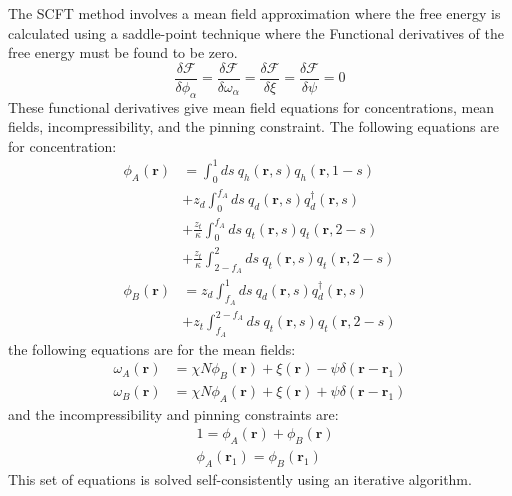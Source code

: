 \documentclass[twocolumn,aps,floatfix,nobibnotes]{revtex4-1}
\begin{document}
The SCFT method involves a mean field approximation where the free energy is calculated using a saddle-point technique where the Functional derivatives of the free energy must be found to be zero.
\begin{equation}
\frac{\delta \mathscr{F} }{\delta \phi_{\alpha}} = \frac{\delta \mathscr{F} }{\delta \omega_{\alpha}} = 
\frac{\delta \mathscr{F} }{\delta \xi} = 
\frac{\delta \mathscr{F} }{\delta \psi} = 0
\end{equation}
These functional derivatives give mean field equations for concentrations, mean fields, incompressibility, and the pinning constraint. The following equations are for concentration:
\begin{align}
\phi_A (\textbf{r}) &= \int_0^1 ds \ q_h (\textbf{r},s) q_h (\textbf{r},1-s) \nonumber \\
&+ z_d \int_0^{f_A} ds \ q_d (\textbf{r},s) q_d^{\dagger} (\textbf{r},s) \nonumber \\
&+ \frac{z_t}{\kappa} \int_0^{f_A} ds \ q_t (\textbf{r},s) q_t (\textbf{r},2-s) \nonumber \\
&+ \frac{z_t}{\kappa} \int_{2-f_A}^{2} ds \ q_t (\textbf{r},s) q_t (\textbf{r},2-s) \\
\phi_B (\textbf{r}) &= z_d \int_{f_A}^1  ds\ q_d (\textbf{r},s) q_d^{\dagger} (\textbf{r},s) \nonumber \\
&+ z_t \int_{f_A}^{2-f_A} ds \ q_t (\textbf{r},s) q_t (\textbf{r},2-s)
\end{align}
the following equations are for the mean fields:
\begin{align}
\omega_A (\textbf{r}) &= \chi N \phi_B(\textbf{r}) + \xi(\textbf{r}) - \psi \delta (\textbf{r}-\textbf{r}_1) \\
\omega_B (\textbf{r}) &= \chi N \phi_A(\textbf{r}) + \xi(\textbf{r}) + \psi \delta (\textbf{r}-\textbf{r}_1)
\end{align}
and the incompressibility and pinning constraints are:
\begin{align}
&1 = \phi_A (\textbf{r}) + \phi_B(\textbf{r}) \\
&\phi_A (\textbf{r}_1) = \phi_B (\textbf{r}_1) 
\end{align}
This set of equations is solved self-consistently using an iterative algorithm. 
\end{document}
